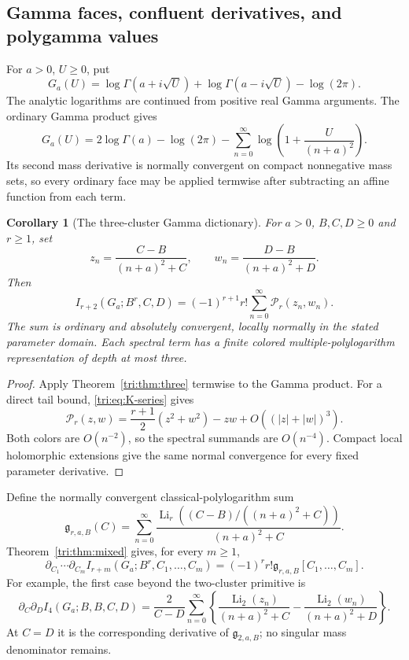 \documentclass[11pt,a4paper]{article}
\newtheorem{corollary}[theorem]{Corollary}
\theoremstyle{definition}
\theoremstyle{remark}
\numberwithin{equation}{section}
\begin{document}
\subsection{Gamma faces, confluent derivatives, and polygamma values}

For $a>0$, $U\ge0$, put
\[
 G_a(U)=\log\Gamma(a+i\sqrt U)+\log\Gamma(a-i\sqrt U)
                                     -\log(2\pi).
\]
The analytic logarithms are continued from positive real Gamma
arguments. The ordinary Gamma product \cite[\S5.8]{DLMF} gives
\[
 G_a(U)=2\log\Gamma(a)-\log(2\pi)
       -\sum_{n=0}^{\infty}
           \log\left(1+\frac{U}{(n+a)^2}\right).
\]
Its second mass derivative is normally convergent on compact
nonnegative mass sets, so every ordinary face may be applied
termwise after subtracting an affine function from each term.

\begin{corollary}[The three-cluster Gamma dictionary]
\label{tri:cor:Gamma}
For $a>0$, $B,C,D\ge0$ and $r\ge1$, set
\[
 z_n=\frac{C-B}{(n+a)^2+C},\qquad
 w_n=\frac{D-B}{(n+a)^2+D}.
\]
Then
\begin{equation}\label{tri:eq:Gamma}
 \boxed{\displaystyle
 I_{r+2}(G_a;B^r,C,D)
   =(-1)^{r+1}r!\sum_{n=0}^{\infty}\mathcal P_r(z_n,w_n).}
\end{equation}
The sum is ordinary and absolutely convergent, locally normally
in the stated parameter domain. Each spectral term has a finite
colored multiple-polylogarithm representation of depth at most
three.
\end{corollary}

\begin{proof}
Apply Theorem~\ref{tri:thm:three} termwise to the Gamma product.
For a direct tail bound, \eqref{tri:eq:K-series} gives
\[
 \mathcal P_r(z,w)=\frac{r+1}{2}(z^2+w^2)-zw
                     +O((|z|+|w|)^3).
\]
Both colors are $O(n^{-2})$, so the spectral summands are
$O(n^{-4})$. Compact local holomorphic extensions give the same
normal convergence for every fixed parameter derivative.
\end{proof}

Define the normally convergent classical-polylogarithm sum
\begin{equation}\label{tri:eq:spectralg}
 \mathfrak g_{r,a,B}(C)=\sum_{n=0}^{\infty}
      \frac{\operatorname{Li}_r((C-B)/((n+a)^2+C))}
           {(n+a)^2+C}.
\end{equation}
Theorem~\ref{tri:thm:mixed} gives, for every $m\ge1$,
\begin{equation}\label{tri:eq:Gamma-mixed}
 \boxed{\displaystyle
 \partial_{C_1}\cdots\partial_{C_m}
 I_{r+m}(G_a;B^r,C_1,\ldots,C_m)
   =(-1)^r r!\mathfrak g_{r,a,B}[C_1,\ldots,C_m].}
\end{equation}
For example, the first case beyond the two-cluster primitive is
\begin{equation}\label{tri:eq:dilog-example}
 \partial_C\partial_D I_4(G_a;B,B,C,D)
   =\frac{2}{C-D}\sum_{n=0}^{\infty}
      \left\{\frac{\operatorname{Li}_2(z_n)}{(n+a)^2+C}
             -\frac{\operatorname{Li}_2(w_n)}{(n+a)^2+D}\right\}.
\end{equation}
At $C=D$ it is the corresponding derivative of
$\mathfrak g_{2,a,B}$; no singular mass denominator remains.
\end{document}
